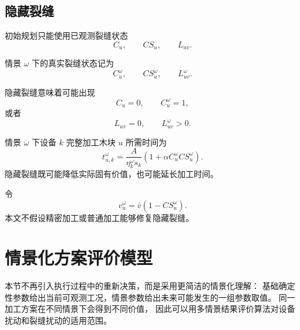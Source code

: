 ﻿\documentclass[UTF8,12pt,a4paper]{ctexart}
\begin{document}
\subsection{隐藏裂缝}

\begin{description}[leftmargin=2em,labelsep=0.5em,itemsep=0.6em]
  \item[\textbf{初始观测裂缝：}]
初始规划只能使用已观测裂缝状态
\[
C_u,\qquad
CS_u,\qquad
L_{uv}.
\]

  \item[\textbf{情景真实裂缝：}]
情景 \(\omega\) 下的真实裂缝状态记为
\[
C_u^\omega,\qquad
CS_u^\omega,\qquad
L_{uv}^{\omega}.
\]

  \item[\textbf{隐藏裂缝含义：}]
隐藏裂缝意味着可能出现
\[
C_u=0,\qquad C_u^\omega=1,
\]
或者
\[
L_{uv}=0,\qquad
L_{uv}^{\omega}>0.
\]

  \item[\textbf{情景加工时间：}]
情景 \(\omega\) 下设备 \(k\) 完整加工木块 \(u\) 所需时间为
\[
\boxed{
t_{u,k}^{\omega}
=
\frac{A}{\eta_k^\omega s_k}
\left(1+\alpha C_u^\omega CS_u^\omega\right).
}
\]
隐藏裂缝既可能降低实际固有价值，也可能延长加工时间。

  \item[\textbf{情景固有价值：}]
令
\[
v_u^\omega=\bar v(1-CS_u^\omega).
\]
本文不假设精密加工或普通加工能够修复隐藏裂缝。
\end{description}

\section{情景化方案评价模型}

本节不再引入执行过程中的重新决策，而是采用更简洁的情景化理解：
基础确定性参数给出当前可观测工况，情景参数给出未来可能发生的一组参数取值。
同一加工方案在不同情景下会得到不同价值，
因此可以用多情景结果评价算法对设备扰动和裂缝扰动的适用范围。
\end{document}

